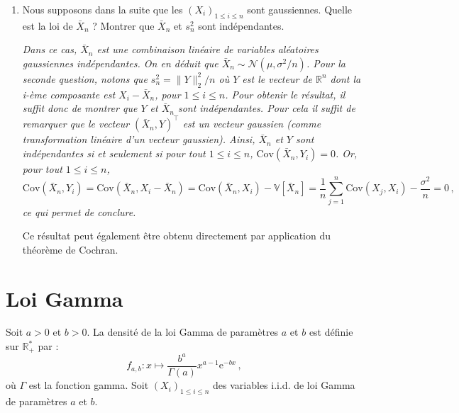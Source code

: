 \documentclass[a4paper,10pt,fleqn]{article}
\newcommand{\1}{\ensuremath{\mathbbm{1}}}
\begin{document}
\begin{enumerate}
\vspace{.2cm}

{\em 
Par d\'efinition,
\begin{align*}
T_n = \sqrt{n-1}\frac{\bar X_n - \mu}{s_n}=\frac{\sqrt{n-1}\sigma}{\sqrt{n}s_n}\sqrt{n}\frac{\bar X_n - \mu}{\sigma}\,.
\end{align*}
En utilisant les questions pr\'ec\'edentes et en appliquant le lemme de Slutsky, on en d\'eduit que  $(T_n)_{n\geq 0}$ converge en loi vers $Z$ o\`u $Z\sim \mathcal{N}(0,1)$.
}

\item  Nous supposons dans la suite que les $(X_i)_{1\leq i\leq n}$ sont gaussiennes. Quelle est la loi de $\bar X_n$ ? Montrer que $\bar X_n$ et $s_n^2$ sont ind\'ependantes.

\vspace{.2cm}

{\em Dans ce cas, $\bar X_n$ est une combinaison lin\'eaire de variables al\'eatoires gaussiennes ind\'ependantes. On en d\'eduit que $\bar X_n\sim \mathcal{N}(\mu, \sigma^2/n)$. Pour la seconde question, notons que 
$s_n^2 = \|Y\|_2^2/n$ o\`u $Y$ est le vecteur de $\mathbb{R}^n$ dont la i-\`eme composante est $X_i-\bar X_n$, pour $1\leq i\leq n$. Pour obtenir le r\'esultat, il suffit donc de montrer que $Y$ et $\bar X_n$ sont ind\'ependantes. Pour cela il suffit de remarquer que le vecteur $(\bar X_n, Y)^\top$ est un vecteur gaussien (comme transformation lin\'eaire d'un vecteur gaussien). Ainsi, $\bar X_n$ et $Y$ sont ind\'ependantes si et seulement si pour tout $1\leq i \leq n $, $\mathrm{Cov}(\bar X_n, Y_i) = 0$. Or, pour tout $1\leq i \leq n $,
$$
\mathrm{Cov}(\bar X_n, Y_i) =\mathrm{Cov}(\bar X_n, X_i - \bar X_n) =  \mathrm{Cov}(\bar X_n, X_i)  - \mathbb{V}[\bar X_n] = \frac{1}{n}\sum_{j=1}^n\mathrm{Cov}(X_j, X_i) - \frac{\sigma^2}{n} = 0\,,
$$
ce qui permet de conclure.

Ce r\'esultat peut \'egalement \^etre obtenu directement par application du th\'eor\`eme de Cochran.}

%
%
%
%
%
%
%
%
\end{enumerate}

\section*{Loi Gamma}
Soit $a>0$ et $b>0$. La densit\'e de la loi Gamma de param\`etres $a$ et $b$ est d\'efinie sur $\mathbb{R}_+^*$ par :
$$
f_{a,b}: x\mapsto \frac{b^a}{\Gamma(a)}x^{a-1}\mathrm{e}^{-b x}\,,
$$
o\`u $\Gamma$ est la fonction gamma. Soit $(X_i)_{1\leq i \leq n}$ des variables i.i.d. de loi Gamma de param\`etres $a$ et $b$.
\end{document}
